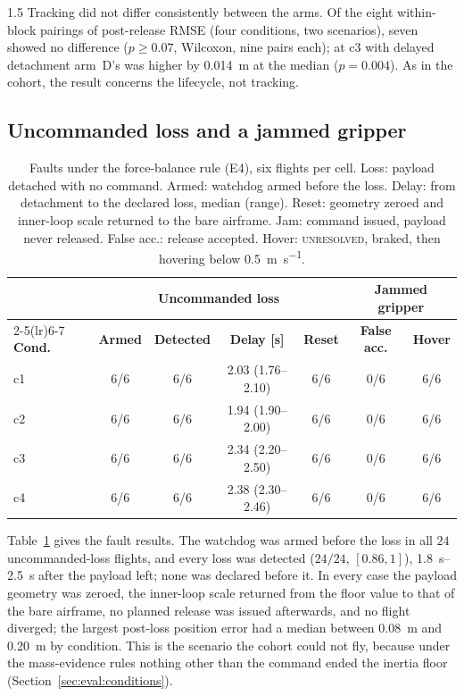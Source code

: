 \begin{spacing}{1.5}
Tracking did not differ consistently between the arms. Of the eight within-block
pairings of post-release RMSE (four conditions, two scenarios), seven showed no
difference ($p\ge0.07$, Wilcoxon, nine pairs each); at c3 with delayed
detachment arm~D's was higher by \SI{0.014}{\meter} at the median ($p=0.004$).
As in the cohort, the result concerns the lifecycle, not tracking.

\subsection{Uncommanded loss and a jammed gripper}\label{sec:eval:camp:loss}

\begin{table}[ht]
\centering
\caption[Faults under the force-balance rule (E4)]{Faults under the
force-balance rule (E4), six flights per cell. Loss: payload detached with no
command. Armed: watchdog armed before the loss. Delay: from detachment to the
declared loss, median (range). Reset: geometry zeroed and inner-loop scale
returned to the bare airframe. Jam: command issued, payload never released.
False acc.: release accepted. Hover: \textsc{unresolved}, braked, then hovering
below \SI{0.5}{\meter\per\second}.}
\label{tab:camp-loss}
\small
\begin{tabular}{@{}l c c c c c c@{}}
\toprule
& \multicolumn{4}{c}{\textbf{Uncommanded loss}} & \multicolumn{2}{c}{\textbf{Jammed gripper}} \\
\cmidrule(lr){2-5}\cmidrule(lr){6-7}
\textbf{Cond.} & \textbf{Armed} & \textbf{Detected} &
\textbf{Delay [s]} & \textbf{Reset} & \textbf{False acc.} &
\textbf{Hover} \\
\midrule
c1 & 6/6 & 6/6 & 2.03 (1.76--2.10) & 6/6 & 0/6 & 6/6 \\
c2 & 6/6 & 6/6 & 1.94 (1.90--2.00) & 6/6 & 0/6 & 6/6 \\
c3 & 6/6 & 6/6 & 2.34 (2.20--2.50) & 6/6 & 0/6 & 6/6 \\
c4 & 6/6 & 6/6 & 2.38 (2.30--2.46) & 6/6 & 0/6 & 6/6 \\
\bottomrule
\end{tabular}
\end{table}

Table~\ref{tab:camp-loss} gives the fault results. The watchdog was armed
before the loss in all $24$ uncommanded-loss flights, and every loss was
detected ($24/24$, $[0.86, 1]$), \SIrange{1.8}{2.5}{\second} after the payload
left; none was declared before it. In every case the payload geometry was
zeroed, the inner-loop scale returned from the floor value to that of the bare
airframe, no planned release was issued afterwards, and no flight diverged;
the largest post-loss position error had a median between \SI{0.08}{\meter} and
\SI{0.20}{\meter} by condition. This is the scenario the cohort could not fly,
because under the mass-evidence rules nothing other than the command ended the
inertia floor (Section~\ref{sec:eval:conditions}).


\end{spacing}
